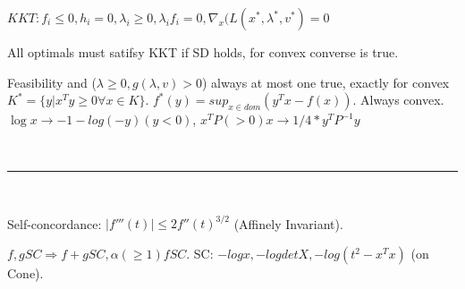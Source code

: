 \documentclass[10pt,twocolumn]{report}
\begin{document}
$KKT: f_i \le 0, h_i = 0, \lambda_i \ge 0, \lambda_i f_i = 0, \nabla_x(L(x^*, \lambda^*, v^*) = 0$

All optimals must satifsy KKT if SD holds, for convex converse is true.

Feasibility and ($\lambda \ge 0, g(\lambda, v) > 0$) always at most one true, exactly for convex    
$K^* = \{y | x^Ty \ge 0 \forall x \in K\}. $
$f^*(y) = sup_{x \in dom} (y^Tx - f(x))$. Always convex.
$\log x \rightarrow -1 - log(-y) (y < 0)$, $x^TP(> 0)x \rightarrow 1/4*y^TP^{-1}y$

~

\hrule 

~

Self-concordance: $|f'''(t)| \le 2f''(t)^{3/2}$ (Affinely Invariant).

$f,g SC \Rightarrow f+g SC, \alpha(\ge 1)f SC$. SC: $-log x, -log det X, -log(t^2 - x^Tx)$ (on Cone).
\end{document}
